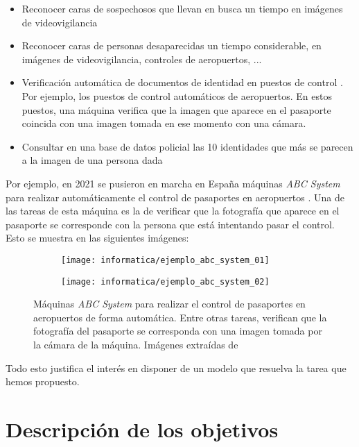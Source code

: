\begin{itemize}
	\item Reconocer caras de sospechosos que llevan en busca un tiempo en imágenes de videovigilancia
	\item Reconocer caras de personas desaparecidas un tiempo considerable, en imágenes de videovigilancia, controles de aeropuertos, ...
	\item Verificación automática de documentos de identidad en puestos de control \cite{informatica:tecnica_sintesis_aifr}. Por ejemplo, los puestos de control automáticos de aeropuertos. En estos puestos, una máquina verifica que la imagen que aparece en el pasaporte coincida con una imagen tomada en ese momento con una cámara.
	\item Consultar en una base de datos policial las 10 identidades que más se parecen a la imagen de una persona dada
\end{itemize}

Por ejemplo, en 2021 se pusieron en marcha en España máquinas \textit{ABC System} para realizar automáticamente el control de pasaportes en aeropuertos \cite{informatica:articulo_abc_system}. Una de las tareas de esta máquina es la de verificar que la fotografía que aparece en el pasaporte se corresponde con la persona que está intentando pasar el control. Esto se muestra en las siguientes imágenes:

\begin{figure}[H]
	\centering
	\begin{subfigure}{0.4\textwidth}
		\texttt{[image: informatica/ejemplo\_abc\_system\_01]}
	\end{subfigure}
	\begin{subfigure}{0.4\textwidth}
		\texttt{[image: informatica/ejemplo\_abc\_system\_02]}
	\end{subfigure}

	\caption{Máquinas \textit{ABC System} para realizar el control de pasaportes en aeropuertos de forma automática. Entre otras tareas, verifican que la fotografía del pasaporte se corresponda con una imagen tomada por la cámara de la máquina. Imágenes extraídas de \cite{informatica:articulo_abc_system}}
\end{figure}

Todo esto justifica el interés en disponer de un modelo que resuelva la tarea que hemos propuesto.

\section{Descripción de los objetivos}

